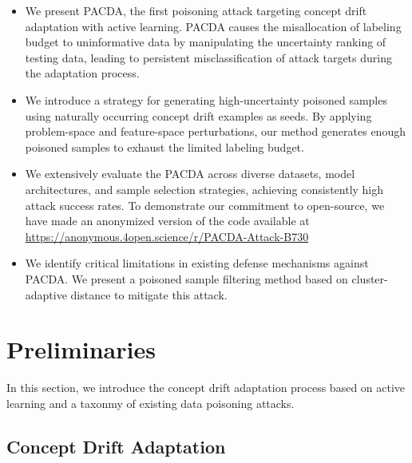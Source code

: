 \documentclass[conference,compsoc]{IEEEtran} %
\begin{document}
\begin{itemize}
	\item We present PACDA, the first poisoning attack targeting concept drift adaptation with active learning.
	PACDA causes the misallocation of labeling budget to uninformative data by manipulating the uncertainty ranking of testing data, leading to persistent misclassification of attack targets during the adaptation process.

	\item We introduce a strategy for generating high-uncertainty poisoned samples using naturally occurring concept drift examples as seeds.
	By applying problem-space and feature-space perturbations, %
	our method generates enough poisoned samples to exhaust the limited labeling budget.

	\item We extensively evaluate the PACDA across diverse datasets, model architectures, and sample selection strategies, achieving consistently high attack success rates. To demonstrate our commitment to open-source, we have made an anonymized version of the code available at \href{https://anonymous.4open.science/r/PACDA-Attack-B730}{https://anonymous.4open.science/r/PACDA-Attack-B730} 

	\item We identify critical limitations in existing defense mechanisms against PACDA.
	We present a poisoned sample filtering method based on cluster-adaptive distance to mitigate this attack.
\end{itemize}


		
		\section{Preliminaries}
In this section, we introduce the concept drift adaptation process based on active learning and a taxonmy of existing data poisoning attacks.

\subsection{Concept Drift Adaptation}
\label{Sec: Concept Drift Adaptation}
\end{document}
